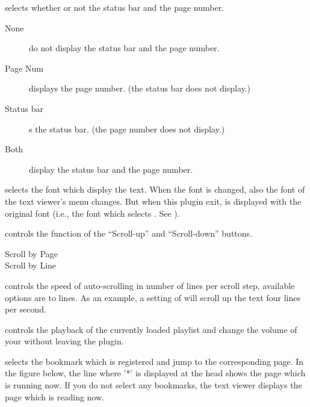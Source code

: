 \begin{description}
\begin{description}
{    \item[Show Footer] selects whether or not the status bar and the page number.
        \begin{description}
            \item[None] do not display the status bar and the page number.
            \item[Page Num] displays the page number. (the status bar does not display.)
            \item[Status bar] s the status bar. (the page number does not display.)
            \item[Both] display the status bar and the page number.
        \end{description}

    \item[Font] selects the font which displsy the text. When the font is changed, also the font of the text viewer's menu changes. But when this plugin exit,  is displayed with the original font (i.e., the font which selects . See ).
    }
    \item[Scroll Mode] controls the function of the ``Scroll-up'' and
    ``Scroll-down'' buttons.
        \begin{description}
            \item[Scroll by Page]
            \item[Scroll by Line]
        \end{description}
    \item[Auto-scroll Speed]
    controls the speed of auto-scrolling in number of lines per scroll step,
    available options are  to  lines. As an example,
    a setting of  will scroll up the text four lines per second.
    \end{description}

\item[Show Playback Menu] controls the playback of the currently loaded playlist
and change the volume of your \dap{} without leaving the plugin.
\item[Select Bookmark] selects the bookmark which is registered and jump to the corresponding page.
In the figure below, the line where '*' is displayed at the head shows the page which is running now.
If you do not select any bookmarks, the text viewer displays the page which is reading now.



\end{description}
